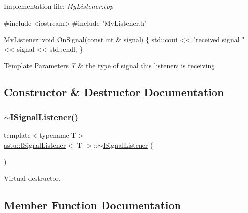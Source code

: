 Implementation file\+: {\itshape My\+Listener.\+cpp}


\begin{DoxyCode}
\textcolor{preprocessor}{#include <iostream>}
\textcolor{preprocessor}{#include "MyListener.h"}

MyListener::void \hyperlink{classastu_1_1ISignalListener_abc538ead0f63533bc60ba0f931b2a5ce}{OnSignal}(\textcolor{keyword}{const} \textcolor{keywordtype}{int} & signal)
\{
  std::cout << \textcolor{stringliteral}{"received signal "} << signal << std::endl;
\}    
\end{DoxyCode}



\begin{DoxyTemplParams}{Template Parameters}
{\em T} & the type of signal this listeners is receiving \\
\hline
\end{DoxyTemplParams}


\subsection{Constructor \& Destructor Documentation}
\mbox{\label{classastu_1_1ISignalListener_a8656a83d9ac0775640edb97e028c3fd9}} 
\subsubsection{\texorpdfstring{$\sim$\+I\+Signal\+Listener()}{~ISignalListener()}}
{\footnotesize\ttfamily template$<$typename T$>$ \\
\hyperlink{classastu_1_1ISignalListener}{astu\+::\+I\+Signal\+Listener}$<$ T $>$\+::$\sim$\hyperlink{classastu_1_1ISignalListener}{I\+Signal\+Listener} (\begin{DoxyParamCaption}{ }\end{DoxyParamCaption})\hspace{0.3cm}{\ttfamily [inline]}}

Virtual destructor. 

\subsection{Member Function Documentation}
\mbox{\label{classastu_1_1ISignalListener_abc538ead0f63533bc60ba0f931b2a5ce}} 

